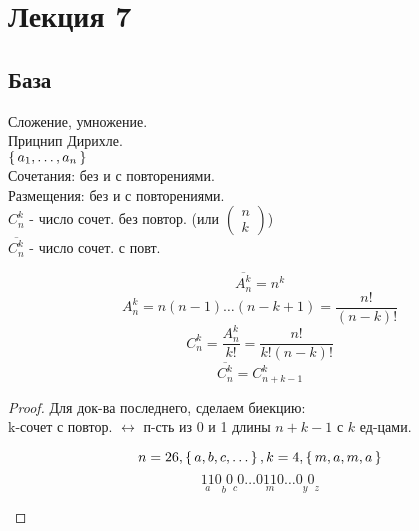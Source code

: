 \section{Лекция 7}
\subsection{База}
Сложение, умножение. \\
Прицнип Дирихле. \\
$\set{a_1, \ldots, a_n}$ \\
Сочетания: без и с повторениями. \\
Размещения: без и с повторениями. \\
$C_n^{k}$ - число сочет. без повтор. (или $\begin{pmatrix} n \\ k \end{pmatrix}$) \\
$\overline{C_n^{k}}$ - число сочет. с повт.
\begin{theorem}
  \[
    \overline{A_n^{k}} = n^{k}
  \]
  \[
    A_n^{k} = n(n - 1)\ldots(n - k + 1) = \frac{n!}{(n - k)!}
  \]
  \[
    C_n^{k} = \frac{A_{n}^{k}}{k!} = \frac{n!}{k!(n - k)!}
  \]
  \[
    \overline{C_{n}^{k}} = C_{n + k - 1}^{k}
  \]
\end{theorem}
\begin{proof}
  Для док-ва последнего, сделаем биекцию:\\

  k-сочет с повтор. $\longleftrightarrow$ п-сть из 0 и 1 длины $n + k - 1$ с $k$ ед-цами. \\

  \begin{example}
    \[
    n = 26, \set{a, b, c, \ldots}, k = 4, \set{m, a, m, a}
    \]
    \[
    \underset{a}{11}0\underset{b}{}0\underset{c}{}0\ldots 0\underset{m}{11}0\ldots 0\underset{y}{}0\underset{z}{}
    \]
  \end{example}
\end{proof}

